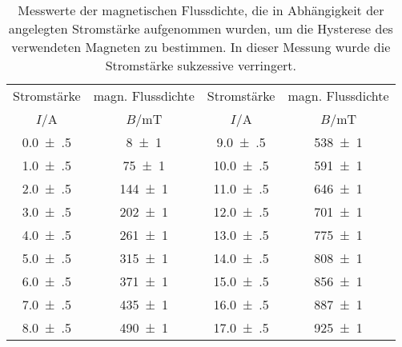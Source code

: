 \begin{table}[!h]
	\centering
	\begin{tabular}{cccc}
		\toprule
		Stromstärke & magn. Flussdichte & Stromstärke & magn. Flussdichte\\
		$I$/\si{\ampere} & $B$/\si{\milli\tesla} & $I$/\si{\ampere} & $B$/\si{\milli\tesla}\\
\midrule
		\num{0.0(5)} & \num{8(1)} & \num{9.0(5)} & \num{538(1)}\\
		\num{1.0(5)} & \num{75(1)} & \num{10.0(5)} & \num{591(1)}\\
		\num{2.0(5)} & \num{144(1)} & \num{11.0(5)} & \num{646(1)}\\
		\num{3.0(5)} & \num{202(1)} & \num{12.0(5)} & \num{701(1)}\\
		\num{4.0(5)} & \num{261(1)} & \num{13.0(5)} & \num{775(1)}\\
		\num{5.0(5)} & \num{315(1)} & \num{14.0(5)} & \num{808(1)}\\
		\num{6.0(5)} & \num{371(1)} & \num{15.0(5)} & \num{856(1)}\\
		\num{7.0(5)} & \num{435(1)} & \num{16.0(5)} & \num{887(1)}\\
		\num{8.0(5)} & \num{490(1)} & \num{17.0(5)} & \num{925(1)}\\
		\bottomrule
	\end{tabular}
	\caption{Messwerte der magnetischen Flussdichte, die in Abhängigkeit der angelegten Stromstärke
                        aufgenommen wurden, um die Hysterese des verwendeten Magneten zu bestimmen.
                        In dieser Messung wurde die Stromstärke sukzessive verringert. \label{tab:hysterese_abnehmend}}
\end{table}
